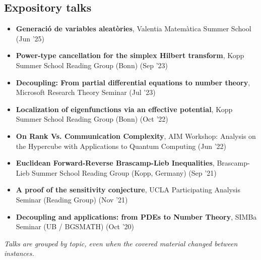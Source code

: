\subsection{\textbf{\color{color1} Expository talks}}

\begin{small}
\begin{itemize}\setlength\itemsep{0pt}
  \item \textbf{Generació de variables aleatòries}, Valentia Matemàtica Summer School (Jun '25)
  \item \textbf{Power-type cancellation for the simplex Hilbert transform}, Kopp Summer School Reading Group (Bonn) (Sep '23)
  \item \textbf{Decoupling: From partial differential equations to number theory}, Microsoft Research Theory Seminar (Jul '23)
  \item \textbf{Localization of eigenfunctions via an effective potential}, Kopp Summer School Reading Group (Bonn) (Oct '22)
  \item \textbf{On Rank Vs. Communication Complexity}, AIM Workshop: Analysis on the Hypercube with Applications to Quantum Computing (Jun '22)
  \item \textbf{Euclidean Forward-Reverse Brascamp-Lieb Inequalities}, Brascamp-Lieb Summer School Reading Group (Kopp, Germany) (Sep '21)
  \item \textbf{A proof of the sensitivity conjecture}, UCLA Participating Analysis Seminar (Reading Group) (Nov '21)
  \item \textbf{Decoupling and applications: from PDEs to Number Theory}, SIMBa Seminar (UB / BGSMATH) (Oct '20)
\end{itemize}
\end{small}

\emph{Talks are grouped by topic, even when the covered material changed between instances.}

